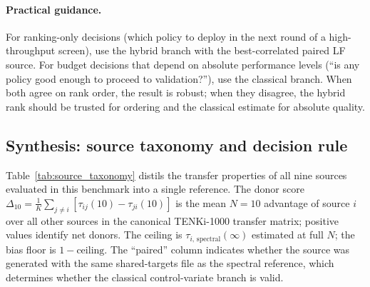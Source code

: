 \documentclass[twoside,twocolumn,9pt]{article}
\begin{document}
\paragraph{Practical guidance.}
For ranking-only decisions (which policy to deploy in the next round of a high-throughput screen), use the hybrid branch with the best-correlated paired LF source.  For budget decisions that depend on absolute performance levels (``is any policy good enough to proceed to validation?''), use the classical branch.  When both agree on rank order, the result is robust; when they disagree, the hybrid rank should be trusted for ordering and the classical estimate for absolute quality.

\subsection{Synthesis: source taxonomy and decision rule}

Table~\ref{tab:source_taxonomy} distils the transfer properties of all nine sources evaluated in this benchmark into a single reference. The donor score $\Delta_{10} = \frac{1}{K}\sum_{j \neq i}[\tau_{ij}(10) - \tau_{ji}(10)]$ is the mean $N=10$ advantage of source $i$ over all other sources in the canonical TENKi-1000 transfer matrix; positive values identify net donors. The ceiling is $\tau_{i,\,\mathrm{spectral}}(\infty)$ estimated at full $N$; the bias floor is $1-\mathrm{ceiling}$. The ``paired'' column indicates whether the source was generated with the same shared-targets file as the spectral reference, which determines whether the classical control-variate branch is valid.
\end{document}
